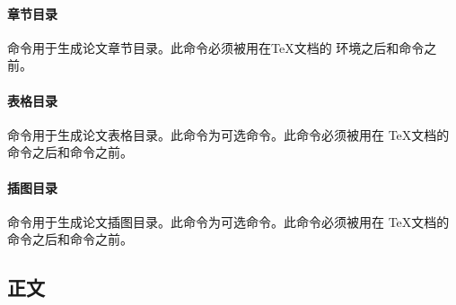 \paragraph{章节目录}

命令用于生成论文章节目录。此命令必须被用在{\TeX}文档的
环境之后和命令之前。
\begin{tex}
\tableofcontents
\end{tex}

\paragraph{表格目录}

命令用于生成论文表格目录。此命令为可选命令。此命令必须被用在
{\TeX}文档的命令之后和命令之前。
\begin{tex}
\listoftables
\end{tex}

\paragraph{插图目录}

命令用于生成论文插图目录。此命令为可选命令。此命令必须被用在
{\TeX}文档的命令之后和命令之前。
\begin{tex}
\listoffigures
\end{tex}






\subsection{正文}

